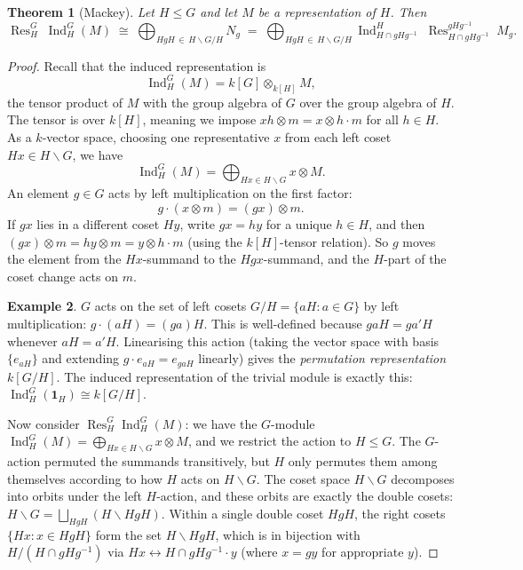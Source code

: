 \documentclass[12pt,a4paper]{article}
\newtheorem{theorem}{Theorem}[section]
\theoremstyle{definition}
\newtheorem{example}[theorem]{Example}
\theoremstyle{remark}
\newcommand{\Ind}{\operatorname{Ind}}
\newcommand{\Res}{\operatorname{Res}}
\begin{document}
\begin{theorem}[Mackey]\label{thm:mackey}
Let $H \leqslant G$ and let $M$ be a representation of $H$. Then
\begin{equation}\label{eq:mackey-KH}
  \Res_H^G\;\Ind_H^G(M)
  \;\cong\;
  \bigoplus_{HgH \,\in\, H \backslash G / H} N_g
  \;=\;
  \bigoplus_{HgH \,\in\, H \backslash G / H}
  \Ind_{H \cap gHg^{-1}}^{H}\;
  \Res_{H \cap gHg^{-1}}^{gHg^{-1}}\;
  M_g.
\end{equation}
\end{theorem}

\begin{proof}
Recall that the induced representation is
\[
  \Ind_H^G(M) = k[G] \otimes_{k[H]} M,
\]
the tensor product of $M$ with the group algebra of $G$ over the group
algebra of $H$. The tensor is over $k[H]$, meaning we impose
$xh \otimes m = x \otimes h \cdot m$ for all $h \in H$. As a
$k$-vector space, choosing one representative $x$ from each left coset
$Hx \in H \backslash G$, we have
\[
  \Ind_H^G(M) = \bigoplus_{Hx \in H \backslash G} x \otimes M.
\]
An element $g \in G$ acts by left multiplication on the first factor:
\begin{equation}\label{eq:G-action-on-ind}
  g \cdot (x \otimes m) = (gx) \otimes m.
\end{equation}
If $gx$ lies in a different coset $Hy$, write $gx = hy$ for a unique
$h \in H$, and then $(gx) \otimes m = hy \otimes m = y \otimes h \cdot m$
(using the $k[H]$-tensor relation). So $g$ moves the element from the
$Hx$-summand to the $Hgx$-summand, and the $H$-part of the coset
change acts on $m$.

\begin{example}
$G$ acts on the set of left cosets $G/H = \{aH : a \in G\}$ by
left multiplication: $g \cdot (aH) = (ga)H$. This is well-defined
because $gaH = ga'H$ whenever $aH = a'H$. Linearising this action
(taking the vector space with basis $\{e_{aH}\}$ and extending
$g \cdot e_{aH} = e_{gaH}$ linearly) gives the \emph{permutation
representation} $k[G/H]$. The induced representation of the trivial
module is exactly this:
$\Ind_H^G(\mathbf{1}_H) \cong k[G/H]$.
\end{example}

Now consider $\Res_H^G \Ind_H^G(M)$: we have the $G$-module
$\Ind_H^G(M) = \bigoplus_{Hx \in H \backslash G} x \otimes M$,
and we restrict the action to $H \leqslant G$. The $G$-action
permuted the summands transitively, but $H$ only permutes them among
themselves according to how $H$ acts on $H \backslash G$. The coset
space $H \backslash G$ decomposes into orbits under the left
$H$-action, and these orbits are exactly the double cosets:
$H \backslash G = \bigsqcup_{HgH} (H \backslash HgH)$.
Within a single double coset $HgH$, the right cosets $\{Hx : x \in HgH\}$
form the set $H \backslash HgH$, which is in bijection with
$H / (H \cap gHg^{-1})$ via $Hx \leftrightarrow H \cap gHg^{-1} \cdot y$
(where $x = gy$ for appropriate $y$).


\end{proof}
\end{document}
